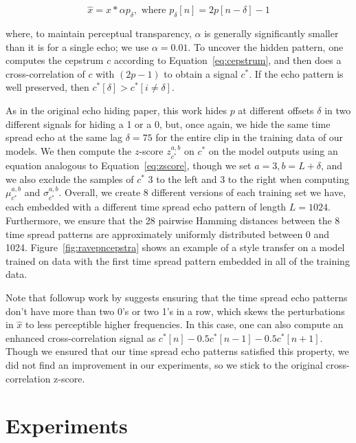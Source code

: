 \documentclass[letterpaper]{article} %
\begin{document}
\begin{equation}
\hat{x} = x * \alpha p_{\delta}, \text{ where } p_{\delta}[n] = 2 p[n - \delta] - 1
\end{equation}

where, to maintain perceptual transparency, $\alpha$ is generally significantly smaller than it is for a single echo; we use $\alpha = 0.01$.  To uncover the hidden pattern, one computes the cepstrum $c$ according to Equation~\ref{eq:cepstrum}, and then does a cross-correlation of $c$ with $(2p - 1)$ to obtain a signal $c^*$.  If the echo pattern is well preserved, then $c^*[\delta] > c^*[i \neq \delta]$.

As in the original echo hiding paper, this work hides $p$ at different offsets $\delta$ in two different signals for hiding a 1 or a 0, but, once again, we hide the same time spread echo at the same lag $\delta=75$ for the entire clip in the training data of our models.  We then compute the $z$-score $z_{c^*}^{a,b}$ on $c^*$ on the model outputs using an equation analogous to Equation~\ref{eq:zscore}, though we set $a = 3, b=L+\delta$, and we also exclude the samples of $c^*$ 3 to the left and 3 to the right when computing $\mu_{c^*}^{a,b}$ and $\sigma_{c^*}^{a,b}$.  Overall, we create 8 different versions of each training set we have, each embedded with a different time spread echo pattern of length $L=1024$.  Furthermore, we ensure that the 28 pairwise Hamming distances between the 8 time spread patterns are approximately uniformly distributed between 0 and 1024.  Figure~\ref{fig:ravepncepstra} shows an example of a style transfer on a model trained on data with the first time spread pattern embedded in all of the training data.


Note that followup work by \cite{xiang2010effective} suggests ensuring that the time spread echo patterns don't have more than two 0's or two 1's in a row, which skews the perturbations in $\hat{x}$ to less perceptible higher frequencies.  In this case, one can also compute an enhanced cross-correlation signal as $c^*[n] - 0.5c^*[n-1] - 0.5c^*[n+1]$.  Though we ensured that our time spread echo patterns satisfied this property, we did not find an improvement in our experiments, so we stick to the original cross-correlation z-score.

\section{Experiments}
\end{document}
